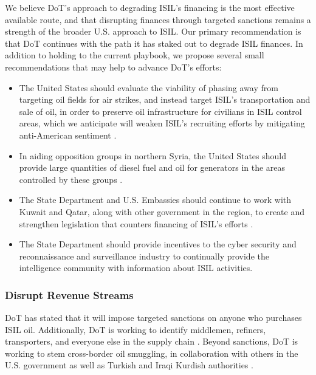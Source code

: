 \documentclass{report}
\begin{document}
We believe DoT's approach to degrading ISIL's financing is the most effective available route, and that disrupting finances through targeted sanctions remains a strength of the broader U.S. approach to ISIL. Our primary recommendation is that DoT continues with the path it has staked out to degrade ISIL finances. In addition to holding to the current playbook, we propose several small recommendations that may help to advance DoT's efforts:


\begin{itemize}
 \item The United States should evaluate the viability of phasing away from targeting oil fields for air strikes, and instead target ISIL's transportation and sale of oil, in order to preserve oil infrastructure for civilians in ISIL control areas, which we anticipate will weaken ISIL's recruiting efforts by mitigating anti-American sentiment \cite{Lister2014}.
 \item In aiding opposition groups in northern Syria, the United States should provide large quantities of diesel fuel and oil for generators in the areas controlled by these groups \cite{Lister2014}.
 \item The State Department and U.S. Embassies should continue to work with Kuwait and Qatar, along with other government in the region, to create and strengthen legislation that counters financing of ISIL's efforts \cite{Lister2014}.
 \item The State Department should provide incentives to the cyber security and reconnaissance and surveillance industry to continually provide the intelligence community with information about ISIL activities.
\end{itemize}




\subsubsection{Disrupt Revenue Streams}

DoT has stated that it will impose targeted sanctions on anyone who purchases ISIL oil. Additionally, DoT is working to identify middlemen, refiners, transporters, and everyone else in the supply chain \cite{Cohen2014}. Beyond sanctions, DoT is working to stem cross-border oil smuggling, in collaboration with others in the U.S. government as well as Turkish and Iraqi Kurdish authorities \cite{Cohen2014}.
\end{document}
